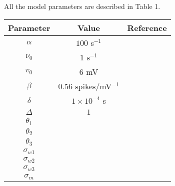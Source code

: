 \documentclass[onecolumn,draftcls]{IEEEtran}
\begin{document}
All the model parameters are described in Table 1.

\begin{tabular}{|c|c|c|}
\hline
Parameter & Value & Reference\\
\hline
$\alpha$ & $100$ s$^{-1}$ &\\
\hline
$\nu_0$ & $1$ s$^{-1}$ &\\
\hline
$v_0$ & $6$ mV &\\
\hline
$\beta$ & $0.56$ spikes/mV$^{-1}$ & \\
\hline
$\delta$ & $1\times10^{-4}$ s &\\
\hline
$\Delta$ & $1$ &\\
\hline
$\theta_1$ &  &\\
\hline
$\theta_2$ &  &\\
\hline
$\theta_3$ &  &\\
\hline
$\sigma_{w1}$ &  &\\
\hline
$\sigma_{w2}$ &  &\\
\hline
$\sigma_{w3}$ &  &\\
\hline
$\sigma_m$ &  &\\
\hline
\end{tabular}
\end{document}

